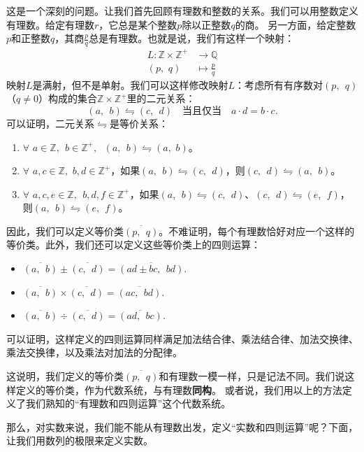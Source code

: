 \documentclass[12pt,UTF8,fontset=none]{ctexbook}
\begin{document}
这是一个深刻的问题。让我们首先回顾有理数和整数的关系。我们可以用整数定义有理数。给定有理数$r$，它总是某个整数$p$除以正整数$q$的商。
另一方面，给定整数$p$和正整数$q$，其商$\frac{p}{q}$总是有理数。也就是说，我们有这样一个映射：
\begin{align*}
    L: \mathbb{Z} \times \mathbb{Z}^+ &\rightarrow \mathbb{Q}  \\
    (p, \,\, q) &\mapsto \frac{p}{q} 
\end{align*}
映射$L$是满射，但不是单射。我们可以这样修改映射$L$：考虑所有有序数对$(p, \;\, q)$（$q\neq 0$）构成的集合$\mathbb{Z} \times \mathbb{Z}^+$里的二元关系：
$$ (a,\;\, b) \leftrightharpoons (c, \;\, d)\quad \mbox{当且仅当} \quad a\cdot d = b \cdot c.$$
可以证明，二元关系$\leftrightharpoons$是等价关系：
\begin{enumerate}
    \item $\forall \,\, a\in \mathbb{Z}, \;\, b\in\mathbb{Z}^+, \;\,\, (a,\;\, b) \leftrightharpoons (a, \,\, b)$。
    \item $\forall \,\, a,c\in \mathbb{Z}, \,\, b,d\in\mathbb{Z}^+$，如果$(a,\;\, b) \leftrightharpoons (c, \;\, d)$，则$ (c, \;\, d)\leftrightharpoons (a,\;\, b)$。
    \item $\forall \,\, a,c,e\in \mathbb{Z}, \;\, b,d,f\in\mathbb{Z}^+$，如果$(a,\;\, b) \leftrightharpoons (c, \;\, d)$、$ (c, \;\, d)\leftrightharpoons (e,\;\, f)$，则$(a,\;\, b) \leftrightharpoons (e,\;\, f)$。
\end{enumerate}
因此，我们可以定义等价类$\overline{(p,\;\, q)}$。不难证明，每个有理数恰好对应一个这样的等价类。此外，我们还可以定义这些等价类上的四则运算：
\begin{itemize}
    \item $\overline{(a,\;\, b)} \pm \overline{(c, \;\, d)} = \overline{(ad \pm bc, \;\, bd)}.$
    \item $\overline{(a,\;\, b)} \times \overline{(c, \;\, d)} = \overline{(ac, \;\, bd)}.$
    \item $\overline{(a,\;\, b)} \div \overline{(c, \;\, d)} = \overline{(ad, \;\,bc)}.$
\end{itemize}
可以证明，这样定义的四则运算同样满足加法结合律、乘法结合律、加法交换律、乘法交换律，以及乘法对加法的分配律。

这说明，我们定义的等价类$\overline{(p,\;\, q)}$和有理数一模一样，只是记法不同。我们说这样定义的等价类，作为代数系统，与有理数\textbf{同构}。
或者说，我们用以上的方法定义了我们熟知的“有理数和四则运算”这个代数系统。

那么，对实数来说，我们能不能从有理数出发，定义“实数和四则运算”呢？下面，让我们用数列的极限来定义实数。
\end{document}
